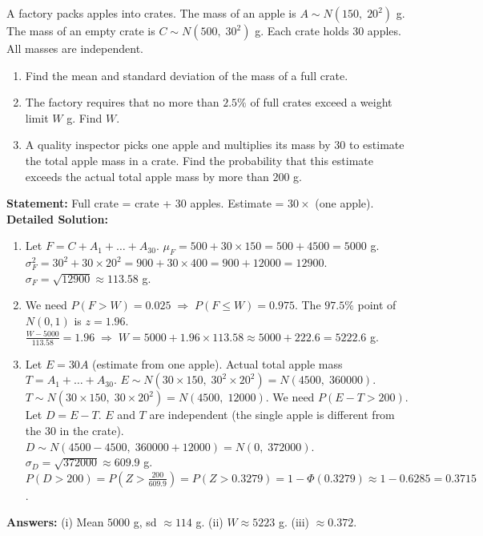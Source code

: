 \documentclass[11pt]{article}
\begin{document}
\begin{exoresolu}
A factory packs apples into crates. The mass of an apple is $A \sim N(150,\; 20^2)$ g. The mass of an empty crate is $C \sim N(500,\; 30^2)$ g. Each crate holds 30 apples. All masses are independent.
\begin{enumerate}
    \item Find the mean and standard deviation of the mass of a full crate.
    \item The factory requires that no more than $2.5\%$ of full crates exceed a weight limit $W$ g. Find $W$.
    \item A quality inspector picks one apple and multiplies its mass by 30 to estimate the total apple mass in a crate. Find the probability that this estimate exceeds the actual total apple mass by more than $200$ g.
\end{enumerate}

\textbf{Statement:} Full crate = crate + 30 apples. Estimate = $30 \times$ (one apple).
\tcblower
\textbf{Detailed Solution:}
\begin{enumerate}
    \item Let $F = C + A_1 + \dots + A_{30}$.
    $\mu_F = 500 + 30 \times 150 = 500 + 4500 = 5000$ g.
    $\sigma_F^2 = 30^2 + 30 \times 20^2 = 900 + 30 \times 400 = 900 + 12000 = 12900$.
    $\sigma_F = \sqrt{12900} \approx 113.58$ g.
    \item We need $P(F > W) = 0.025 \;\Rightarrow\; P(F \le W) = 0.975$.
    The $97.5\%$ point of $N(0,1)$ is $z = 1.96$.
    $\frac{W - 5000}{113.58} = 1.96 \;\Rightarrow\; W = 5000 + 1.96 \times 113.58 \approx 5000 + 222.6 = 5222.6$ g.
    \item Let $E = 30A$ (estimate from one apple). Actual total apple mass $T = A_1 + \dots + A_{30}$.
    $E \sim N(30 \times 150,\; 30^2 \times 20^2) = N(4500,\; 360000)$.
    $T \sim N(30 \times 150,\; 30 \times 20^2) = N(4500,\; 12000)$.
    We need $P(E - T > 200)$. Let $D = E - T$.
    $E$ and $T$ are independent (the single apple is different from the 30 in the crate).
    $D \sim N(4500 - 4500,\; 360000 + 12000) = N(0,\; 372000)$.
    $\sigma_D = \sqrt{372000} \approx 609.9$ g.
    $P(D > 200) = P\left(Z > \frac{200}{609.9}\right) = P(Z > 0.3279) = 1 - \Phi(0.3279) \approx 1 - 0.6285 = 0.3715$.
\end{enumerate}
\textbf{Answers:} (i) Mean $5000$ g, sd $\approx 114$ g. (ii) $W \approx 5223$ g. (iii) $\approx 0.372$.
\end{exoresolu}
\end{document}
